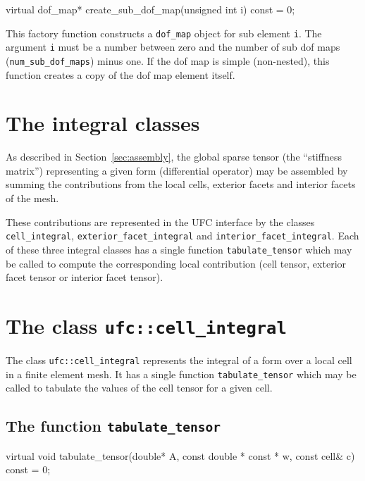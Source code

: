 \begin{code}
virtual dof_map* create_sub_dof_map(unsigned int i) const = 0;
\end{code}

This factory function constructs a \texttt{dof\_map} object for sub
element \texttt{i}. The argument \texttt{i} must be a number between
zero and the number of sub dof maps (\texttt{num\_sub\_dof\_maps})
minus one. If the dof map is simple (non-nested), this function
creates a copy of the dof map element itself.

\section{The integral classes}

As described in Section~\ref{sec:assembly}, the global sparse tensor
(the ``stiffness matrix'') representing a given form (differential
operator) may be assembled by summing the contributions from the local
cells, exterior facets and interior facets of the mesh.

These contributions are represented in the UFC interface by the
classes \texttt{cell\_integral}, \texttt{exterior\_facet\_integral}
and \texttt{interior\_facet\_integral}. Each of these three integral
classes has a single function \texttt{tabulate\_tensor} which may be
called to compute the corresponding local contribution (cell tensor,
exterior facet tensor or interior facet tensor).

\section{The class \texttt{ufc::cell\_integral}}

The class \texttt{ufc::cell\_integral} represents the integral of a
form over a local cell in a finite element mesh. It has a single
function \texttt{tabulate\_tensor} which may be called to tabulate the
values of the cell tensor for a given cell.

\subsection{The function \texttt{tabulate\_tensor}}

\begin{code}
virtual void tabulate_tensor(double* A,
                             const double * const * w,
                             const cell& c) const = 0;
\end{code}

